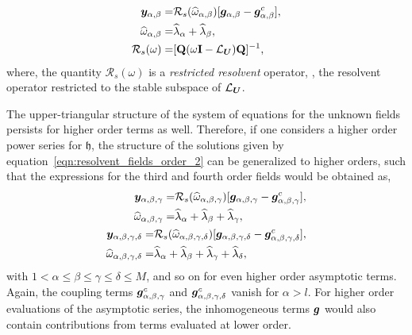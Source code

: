 	\begin{align}
	\label{eqn:resolvent_fields_order_2}
	\begin{split}
		\boldsymbol{y}_{\alpha,\beta} =&  \mathcal{R}_{s}(\widehat{\omega}_{\alpha,\beta})[\boldsymbol{g}_{\alpha,\beta} - \boldsymbol{g}^{c}_{\alpha,\beta}], \\
		\widehat{\omega}_{\alpha,\beta} =& \widehat{\lambda}_{\alpha} + \widehat{\lambda}_{\beta}, \\
		\mathcal{R}_{s}(\omega) =& [\mathbf{Q}(\omega\mathbf{I} 
		- \mathcal{L}_{\boldsymbol{U}})\mathbf{Q}]^{-1},
	\end{split}
\end{align}
where, the quantity $\mathcal{R}_{s}(\omega)$ is a \emph{restricted resolvent} operator, \ie, the resolvent operator restricted to the stable subspace of $\mathcal{L}_{\boldsymbol{U}}$. 

The upper-triangular structure of the system of equations for the unknown fields persists for higher order terms as well. Therefore, if one considers a higher order power series for $\mathfrak{h}$, the structure of the solutions given by equation~\eqref{eqn:resolvent_fields_order_2} can be generalized to higher orders, such that the expressions for the third and fourth order fields would be obtained as,
\begin{subequations}
	\label{eqn:resolvent_fields_higher_order}
	\begin{align}
		\label{eqn:resolvent_fields_order_3}
		\begin{split}
			\boldsymbol{y}_{\alpha,\beta,\gamma} =&  	\mathcal{R}_{s}(\widehat{\omega}_{\alpha,\beta,\gamma})[\boldsymbol{g}_{\alpha,\beta,\gamma} - \boldsymbol{g}^{c}_{\alpha,\beta,\gamma}], \\
			\widehat{\omega}_{\alpha,\beta,\gamma} =& \widehat{\lambda}_{\alpha} + 	\widehat{\lambda}_{\beta} + \widehat{\lambda}_{\gamma},
		\end{split}  \\ 
		\label{eqn:resolvent_fields_order_4}
		\begin{split}
			\boldsymbol{y}_{\alpha,\beta,\gamma,\delta} =&  	\mathcal{R}_{s}(\widehat{\omega}_{\alpha,\beta,\gamma,\delta})[\boldsymbol{g}_{\alpha,\beta,\gamma,\delta} - \boldsymbol{g}^{c}_{\alpha,\beta,\gamma,\delta}], \\
			\widehat{\omega}_{\alpha,\beta,\gamma,\delta} =& \widehat{\lambda}_{\alpha} + 	\widehat{\lambda}_{\beta} + \widehat{\lambda}_{\gamma} + \widehat{\lambda}_{\delta},
		\end{split}
	\end{align}
\end{subequations}
with $1<\alpha\le\beta\le\gamma\le\delta\le M$, and so on for even higher order asymptotic terms. Again, the coupling terms $\boldsymbol{g}^{c}_{\alpha,\beta,\gamma}$ and $\boldsymbol{g}^{c}_{\alpha,\beta,\gamma,\delta}$ vanish for $\alpha > l$. For higher order evaluations of the asymptotic series, the inhomogeneous terms $\boldsymbol{g}$ would also contain contributions from terms evaluated at lower order. 

